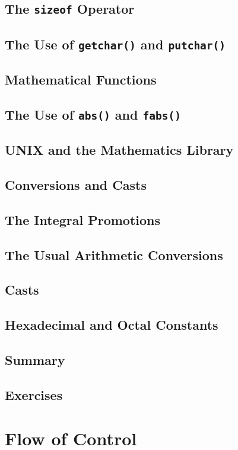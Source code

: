 \documentclass{article}
\begin{document}
\section{The \texttt{sizeof} Operator} \label{sec:sizeof_operator}
\section{The Use of \texttt{getchar()} and \texttt{putchar()}} \label{sec:getchar_putchar}
\section{Mathematical Functions} \label{sec:mathematical_functions}
\section{The Use of \texttt{abs()} and \texttt{fabs()}} \label{sec:abs_fabs}
\section{UNIX and the Mathematics Library} \label{sec:unix_math_library}

\section{Conversions and Casts}
\section{The Integral Promotions}
\section{The Usual Arithmetic Conversions}
\section{Casts}
\section{Hexadecimal and Octal Constants}
\section{Summary}
\section{Exercises}

\chapter{Flow of Control}
\end{document}
